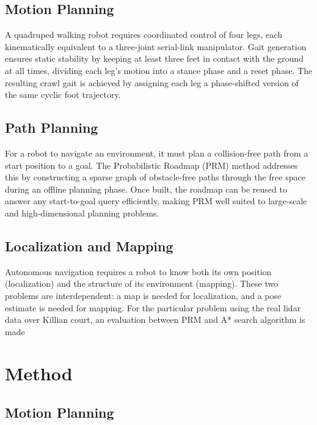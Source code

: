 \documentclass[a4paper,12pt]{article}
\begin{document}
\subsection{Motion Planning}

A quadruped walking robot requires coordinated control of four legs, each
kinematically equivalent to a three-joint serial-link manipulator. Gait
generation ensures static stability by keeping at least three feet in contact
with the ground at all times, dividing each leg's motion into a stance phase
and a reset phase. The resulting crawl gait is achieved by assigning each leg
a phase-shifted version of the same cyclic foot trajectory.

\subsection{Path Planning}

For a robot to navigate an environment, it must plan a collision-free path from
a start position to a goal. The Probabilistic Roadmap (PRM) method addresses
this by constructing a sparse graph of obstacle-free paths through the free
space during an offline planning phase. Once built, the roadmap can be reused
to answer any start-to-goal query efficiently, making PRM well suited to
large-scale and high-dimensional planning problems.

\subsection{Localization and Mapping}

Autonomous navigation requires a robot to know both its own position
(localization) and the structure of its environment (mapping). These two
problems are interdependent: a map is needed for localization, and a pose
estimate is needed for mapping. For the particular problem using the real lidar data over Killian court,
an evaluation between PRM and A* search algorithm is made 

\section{Method}

\subsection{Motion Planning}
\end{document}
